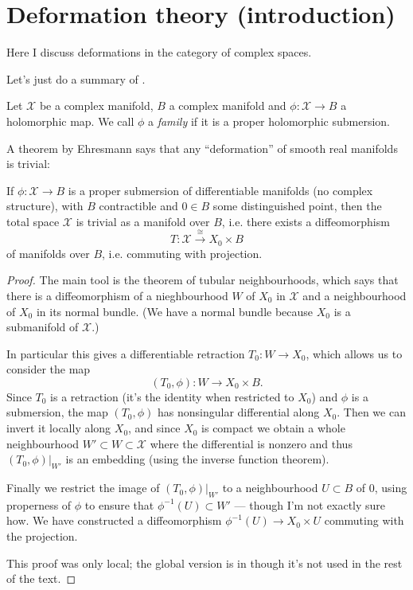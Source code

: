 \documentclass{book}
\begin{document}
\section{Deformation theory (introduction)}
\label{section-deformations}

\noindent
Here I discuss deformations in the category
of complex spaces.

Let's just do a summary of \cite[Chapter
9]{Voisin}.

Let $\mathcal{X}$ be a complex manifold, $B$
a complex manifold
and $\phi:\mathcal{X} \to B$ a holomorphic
map.
We call $\phi$ a {\it family} if it is a
proper holomorphic submersion.

A theorem by Ehresmann says that any
``deformation'' of
smooth real manifolds is trivial:

\begin{theorem}[Ehresmann]
\label{theorem-ehresmann}
\begin{reference}
\cite[Theorem 9.3]{voi}
\end{reference}
If $\phi:\mathcal{X} \to B$ is a
proper submersion of differentiable manifolds
(no complex structure), with $B$ contractible
and $0 \in B$
some distinguished point,
then the total space $\mathcal{X}$ is trivial
as a
manifold over $B$, i.e.
there exists a diffeomorphism
 $$
T:\mathcal{X}\xrightarrow{\cong}X_0 \times B
$$
of manifolds over $B$, i.e. commuting with
projection.
\end{theorem}

\begin{proof}
The main tool is the theorem of tubular
neighbourhoods,
which says that there is a diffeomorphism of
a nieghbourhood $W$ of $X_0$ in $\mathcal{X}$
and a neighbourhood of $X_0$ in its normal
bundle.
(We have a normal bundle because $X_0$ is a
submanifold of $\mathcal{X}$.)

In particular this gives a differentiable
retraction
$T_0:W \to X_0$, which allows us to consider
the map
$$
(T_0,\phi):W \to X_0 \times B.
$$
Since $T_0$ is a retraction
(it's the identity when restricted to $X_0$)
and $\phi$ is a submersion,
the map $(T_0,\phi)$ has nonsingular
differential along $X_0$.
Then we can invert it locally along $X_0$,
and since $X_0$ is compact we obtain a whole
neighbourhood $W'\subset W \subset
\mathcal{X}$
where the differential is nonzero and thus
$(T_0,\phi)|_{W'}$ is an embedding
(using the inverse function theorem).

Finally we restrict the image of
$(T_0,\phi)|_{W'}$
to a neighbourhood $U\subset B$ of $0$,
using properness of $\phi$ to ensure
that $\phi^{-1}(U) \subset W'$ --- though I'm
not exactly sure how.
We have constructed a diffeomorphism
$\phi^{-1}(U) \to X_0 \times U$
commuting with the projection.

This proof was only local; the global version
is in \cite{voi} though it's not used in
the rest of the text.
\end{proof}
\end{document}
